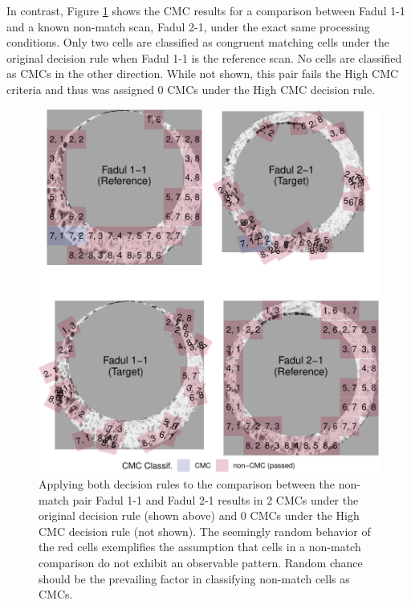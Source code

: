 In contrast, Figure \ref{fig:knmCMCPlot} shows the CMC results for a comparison between Fadul 1-1 and a known non-match scan, Fadul 2-1, under the exact same processing conditions.
Only two cells are classified as congruent matching cells under the original decision rule when Fadul 1-1 is the reference scan.
No cells are classified as CMCs in the other direction.
While not shown, this pair fails the High CMC criteria and thus was assigned 0 CMCs under the High CMC decision rule.

\begin{figure}[htbp]

{\centering \includegraphics[width=\textwidth]{figures/knmOriginalMethod} 

}

\caption{Applying both decision rules to the comparison between the non-match pair Fadul 1-1 and Fadul 2-1 results in 2 CMCs under the original decision rule (shown above) and 0 CMCs under the High CMC decision rule (not shown). The seemingly random behavior of the red cells exemplifies the assumption that cells in a non-match comparison do not exhibit an observable pattern. Random chance should be the prevailing factor in classifying non-match cells as CMCs.}\label{fig:knmCMCPlot}
\end{figure}

